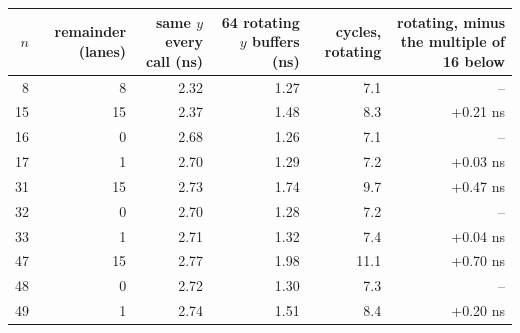 \begin{tabular}{rrrrrr}
\toprule
$n$ & remainder (lanes) & same $y$ every call (ns) & 64 rotating $y$ buffers (ns) & cycles, rotating & rotating, minus the multiple of 16 below \\
\midrule
8 & 8 & 2.32 & 1.27 & 7.1 & -- \\
15 & 15 & 2.37 & 1.48 & 8.3 & +0.21 ns \\
16 & 0 & 2.68 & 1.26 & 7.1 & -- \\
17 & 1 & 2.70 & 1.29 & 7.2 & +0.03 ns \\
31 & 15 & 2.73 & 1.74 & 9.7 & +0.47 ns \\
32 & 0 & 2.70 & 1.28 & 7.2 & -- \\
33 & 1 & 2.71 & 1.32 & 7.4 & +0.04 ns \\
47 & 15 & 2.77 & 1.98 & 11.1 & +0.70 ns \\
48 & 0 & 2.72 & 1.30 & 7.3 & -- \\
49 & 1 & 2.74 & 1.51 & 8.4 & +0.20 ns \\
\bottomrule
\end{tabular}
